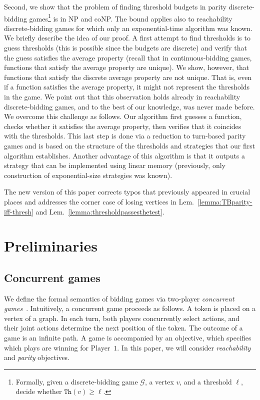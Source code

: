 \documentclass{theoretics}
\newcommand{\PO}{Player~$1$\xspace}
\newcommand{\G}{{\mathcal G}}
\newcommand{\thresh}{\texttt{Th}\xspace}
\begin{document}
Second, we show that the problem of finding threshold budgets in parity discrete-bidding games\footnote{Formally, given a discrete-bidding game $\G$, a vertex $v$, and a threshold $\ell$, decide whether $\thresh(v) \geq \ell$.} 
is in NP and coNP. The bound applies also to reachability discrete-bidding games for which only an exponential-time algorithm was known. 
We briefly describe the idea of our proof. A first attempt to find thresholds is to guess thresholds (this is possible since the budgets are discrete) and verify that the guess satisfies the average property (recall that in continuous-bidding games, functions that satisfy the average property are unique). 
We show, however, that functions that satisfy the discrete average property are not unique. That is, even if a function satisfies the average property, it might not represent the thresholds in the game. We point out that this observation holds already in reachability discrete-bidding games, and to the best of our knowledge, was never made before. 
We overcome this challenge as follows. Our algorithm first guesses a function, checks whether it satisfies the average property, then verifies that it coincides with the thresholds. This last step is done via a reduction to turn-based parity games and is based on the structure of the thresholds and strategies that our first algorithm establishes. 
Another advantage of this algorithm is that it outputs a strategy that can be implemented using linear memory (previously, only construction of exponential-size strategies was known).

The new version of this paper corrects typos that previously appeared in crucial places and addresses the corner case of losing vertices in Lem.~\ref{lemma:TBparity-iff-thresh} and Lem.~\ref{lemma:thresholdpassesthetest}. 




















\section{Preliminaries}

\subsection{Concurrent games}
We define the formal semantics of bidding games via two-player {\em concurrent games}~\cite{AHK02}. Intuitively, a concurrent game proceeds as follows. A token is placed on a vertex of a graph. In each turn, both players concurrently select actions, and their joint actions determine the next position of the token. The outcome of a game is an infinite path. A game is accompanied by an objective, which specifies which plays are winning for \PO. 
In this paper, we will consider {\em reachability} and {\em parity} objectives. 
\end{document}
